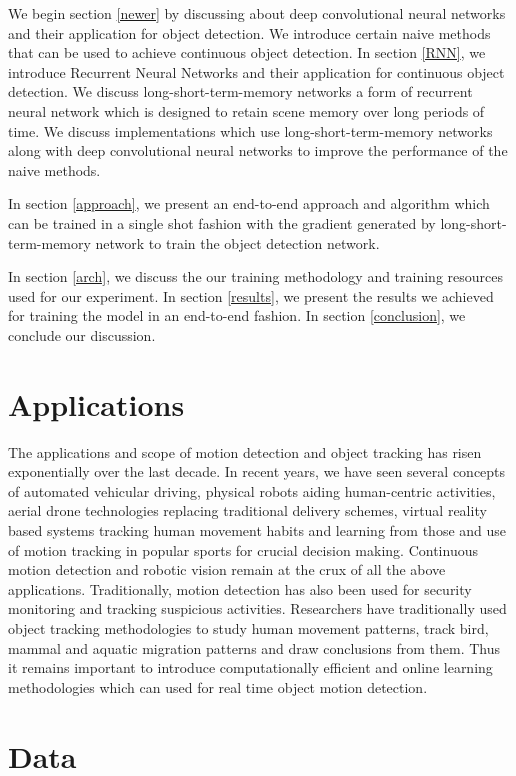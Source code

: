 \documentclass[sigconf]{acmart}
\begin{document}
We begin section \ref{newer} by discussing about deep convolutional neural networks and their application for object detection. We introduce certain naive methods that can be used to achieve continuous object detection. In section \ref{RNN}, we introduce Recurrent Neural Networks and their application for continuous object detection. We discuss long-short-term-memory networks a form of recurrent neural network which is designed to retain scene memory over long periods of time. We discuss implementations which use long-short-term-memory networks along with deep convolutional neural networks to improve the performance of the naive methods. 

In section \ref{approach}, we present an end-to-end approach and algorithm which can be trained in a single shot fashion with the gradient generated by long-short-term-memory network to train the object detection network. 

In section \ref{arch}, we discuss the our training methodology and training resources used for our experiment. In section \ref{results}, we present the results we achieved for training the model in an end-to-end fashion. In section \ref{conclusion}, we conclude our discussion.

\section{Applications}\label{applications}

The applications and scope of motion detection and object tracking has risen exponentially over the last decade. In recent years, we have seen several concepts of automated vehicular driving, physical robots aiding human-centric activities, aerial drone technologies replacing traditional delivery schemes, virtual reality based systems tracking human movement habits and learning from those and use of motion tracking in popular sports for crucial decision making\cite{sports}. Continuous motion detection and robotic vision remain at the crux of all the above applications. Traditionally, motion detection has also been used for security monitoring \cite{6139506} and tracking suspicious activities. Researchers have traditionally used object tracking methodologies to study human movement patterns, track bird, mammal and aquatic migration patterns and draw conclusions from them. Thus it remains important to introduce computationally efficient and online learning methodologies which can used for real time object motion detection.

\section{Data} \label{experimentaldata}
\end{document}
